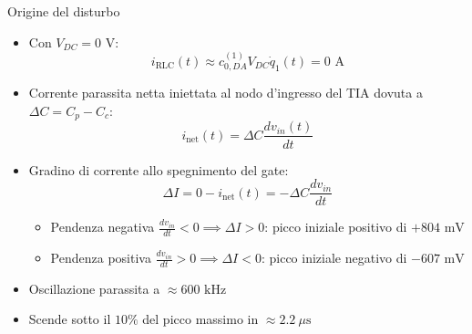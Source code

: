 \documentclass[aspectratio=169, 10pt]{beamer}
\begin{document}
\begin{frame}{Origine del disturbo}
\begin{itemize}
  \setlength{\itemsep}{0.02em}
  \item Con $V_{DC} = 0\text{ V}$:
  \[
    i_{\text{RLC}}(t) \approx c_{0,DA}^{(1)} V_{DC} \dot{q}_1(t) = 0\text{ A}
  \]

  \item Corrente parassita netta iniettata al nodo d'ingresso del TIA dovuta a $\Delta C = C_p - C_c$:
  \[
    i_{\text{net}}(t) = \Delta C \frac{dv_{in}(t)}{dt}
  \]

  \item Gradino di corrente allo spegnimento del gate:
  \[
    \Delta I = 0 - i_{\text{net}}(t) = -\Delta C \frac{dv_{in}}{dt}
  \]
  \begin{itemize}
    \setlength{\itemsep}{0.1em}
    \item Pendenza negativa $\frac{dv_{in}}{dt} < 0 \implies \Delta I > 0$: picco iniziale positivo di $+804\text{ mV}$ 
    \item Pendenza positiva $\frac{dv_{in}}{dt} > 0 \implies \Delta I < 0$: picco iniziale negativo di $-607\text{ mV}$
  \end{itemize}


    \item Oscillazione parassita a $\approx 600\text{ kHz}$
    \item Scende sotto il $10\%$ del picco massimo in $\approx 2.2\ \mu\text{s}$
  \end{itemize}
\end{frame}
\end{document}
